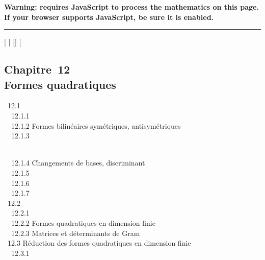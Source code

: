 \textbf{Warning: 
requires JavaScript to process the mathematics on this page.\\ If your
browser supports JavaScript, be sure it is enabled.}

\begin{center}\rule{3in}{0.4pt}\end{center}

{[}
{[}
{[}{]}
{[}

\subsection{Chapitre~12\\Formes quadratiques}

~12.1  \\
~~12.1.1  \\
~~12.1.2 {Formes bilinéaires
symétriques, antisymétriques} \\ ~~12.1.3

\\ ~~12.1.4 {Changements de
bases, discriminant} \\ ~~12.1.5
 \\ ~~12.1.6
 \\
~~12.1.7  \\ ~12.2
 \\ ~~12.2.1
 \\
~~12.2.2 {Formes quadratiques en
dimension finie} \\ ~~12.2.3
{Matrices et déterminants de
Gram} \\ ~12.3 {Réduction des
formes quadratiques en dimension finie} \\ ~~12.3.1

